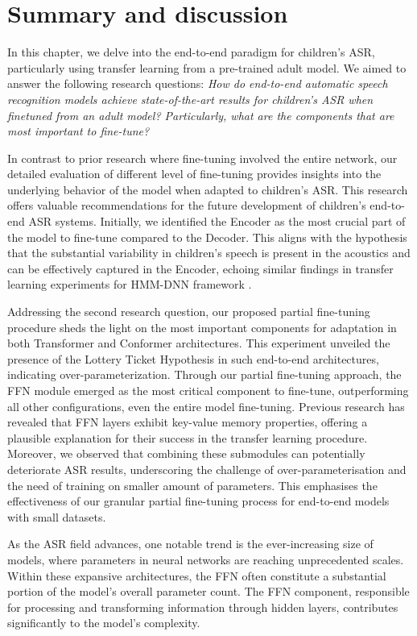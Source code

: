 \section{Summary and discussion}

In this chapter, we delve into the end-to-end paradigm for children's \ac{ASR}, particularly using transfer learning from a pre-trained adult model. We aimed to answer the following research questions: \textit{How do end-to-end automatic speech recognition models achieve state-of-the-art results for children's ASR when finetuned from an adult model? Particularly, what are the components that are most important to fine-tune?}

In contrast to prior research where fine-tuning involved the entire network, our detailed evaluation of different level of fine-tuning provides insights into the underlying behavior of the model when adapted to children's \ac{ASR}. This research offers valuable recommendations for the future development of children's end-to-end \ac{ASR} systems. Initially, we identified the Encoder as the most crucial part of the model to fine-tune compared to the Decoder. This aligns with the hypothesis that the substantial variability in children's speech is present in the acoustics and can be effectively captured in the Encoder, echoing similar findings in transfer learning experiments for \ac{HMM-DNN} framework \cite{TFchildren}.

Addressing the second research question, our proposed partial fine-tuning procedure sheds the light on the most important components for adaptation in both Transformer and Conformer architectures. This experiment unveiled the presence of the Lottery Ticket Hypothesis in such end-to-end architectures, indicating over-parameterization. Through our partial fine-tuning approach, the \ac{FFN} module emerged as the most critical component to fine-tune, outperforming all other configurations, even the entire model fine-tuning. Previous research \cite{geva2020transformer} has revealed that \ac{FFN} layers exhibit key-value memory properties, offering a plausible explanation for their success in the transfer learning procedure. Moreover, we observed that combining these submodules can potentially deteriorate \ac{ASR} results, underscoring the challenge of over-parameterisation and the need of training on smaller amount of parameters. This emphasises the effectiveness of our granular partial fine-tuning process for end-to-end models with small datasets.

As the \ac{ASR} field advances, one notable trend is the ever-increasing size of models, where parameters in neural networks are reaching unprecedented scales. Within these expansive architectures, the \ac{FFN} often constitute a substantial portion of the model's overall parameter count. The \ac{FFN} component, responsible for processing and transforming information through hidden layers, contributes significantly to the model's complexity.

